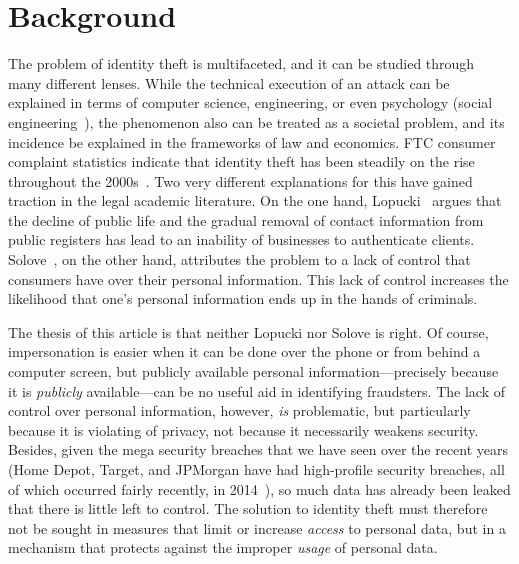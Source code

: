 \documentclass[conference]{IEEEtran}
\begin{document}
\section{Background}
The problem of identity theft is multifaceted, and it can be studied through many different lenses. While the technical execution of an attack can be explained in terms of computer science, engineering, or even psychology (social engineering~\cite{granger2001social}), the phenomenon also can be treated as a societal problem, and its incidence be explained in the frameworks of law and economics. FTC consumer complaint statistics indicate that identity 
theft has been steadily on the rise throughout the 2000s~\cite{finklea2010identity}. Two very different explanations for this have gained traction in the legal academic literature. On the one hand, Lopucki~\cite{lopucki2002did} argues that the decline of public life and the gradual removal of contact information from public registers has lead to an inability of businesses to authenticate clients. Solove~\cite{solove2002identity}, on the other hand, attributes the problem to a lack of control that consumers have over their personal information. This lack of control increases the likelihood that one's personal information ends up in the hands of criminals.

The thesis of this article is that neither Lopucki nor Solove is right. Of course, impersonation is easier when it can be done over the phone or from behind a computer screen, but publicly available personal information---precisely because it is \emph{publicly} available---can be no useful aid in identifying fraudsters. The lack of control over personal information, however, \emph{is} problematic, but particularly because it is violating of privacy, not because it necessarily weakens security. Besides, given the mega security breaches that we have seen over the recent years (Home Depot, Target, and JPMorgan have had high-profile security breaches, all of which occurred fairly recently, in 2014~\cite{walters2014cyber}), so much data has already been leaked that there is little left to control. The solution to identity theft must therefore not be sought in measures that limit or increase \emph{access} to personal data, but in a mechanism that protects against the improper \emph{usage} of personal data.
\end{document}
